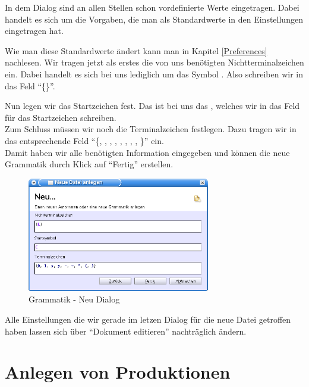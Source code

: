 In dem Dialog sind an allen Stellen schon vordefinierte Werte eingetragen.
Dabei handelt es sich um die Vorgaben, die man als Standardwerte in den
Einstellungen eingetragen hat.

Wie man diese Standardwerte ändert kann man in Kapitel \ref{Preferences}
nachlesen. Wir tragen jetzt als erstes die von uns benötigten
Nichtterminalzeichen ein. Dabei handelt es sich bei uns lediglich um das Symbol
. Also schreiben wir in das Feld
"`\{\}"'.\vspace{10pt}

Nun legen wir das Startzeichen fest. Das ist bei uns das ,
welches wir in das Feld für das Startzeichen schreiben.\\
Zum Schluss müssen wir noch die Terminalzeichen festlegen. Dazu tragen
wir in das entsprechende Feld "`\{, ,
, , \TerminalSymbol{-}, \TerminalSymbol{+},
\TerminalSymbol{*}, \TerminalSymbol{(}, \TerminalSymbol{)}\}"' ein.\\ Damit
haben wir alle benötigten Information eingegeben und können die neue Grammatik
durch Klick auf "`Fertig"' erstellen.\vspace{10pt}

\begin{figure}[h]
\begin{center}
\includegraphics[width=8cm]{../images/new_dialog_grammar.png}
\caption{Grammatik - Neu Dialog}
\end{center}
\end{figure}

Alle Einstellungen die wir gerade im letzen Dialog für die neue Datei getroffen
haben lassen sich über "`Dokument editieren"' nachträglich ändern.

\section{Anlegen von Produktionen}

